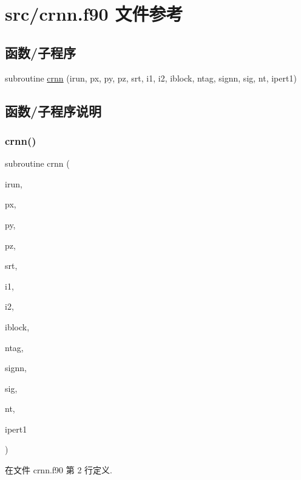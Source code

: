 \hypertarget{crnn_8f90}{}\section{src/crnn.f90 文件参考}
\label{crnn_8f90}
\subsection*{函数/子程序}
\begin{DoxyCompactItemize}
\item 
subroutine \mbox{\hyperlink{crnn_8f90_aee34fcfa3e0f0b41684097aa4d952c65}{crnn}} (irun, px, py, pz, srt, i1, i2, iblock, ntag, signn, sig, nt, ipert1)
\end{DoxyCompactItemize}


\subsection{函数/子程序说明}
\mbox{\label{crnn_8f90_aee34fcfa3e0f0b41684097aa4d952c65}} 
\subsubsection{\texorpdfstring{crnn()}{crnn()}}
{\footnotesize\ttfamily subroutine crnn (\begin{DoxyParamCaption}\item[{}]{irun,  }\item[{}]{px,  }\item[{}]{py,  }\item[{}]{pz,  }\item[{}]{srt,  }\item[{}]{i1,  }\item[{}]{i2,  }\item[{}]{iblock,  }\item[{}]{ntag,  }\item[{}]{signn,  }\item[{}]{sig,  }\item[{}]{nt,  }\item[{}]{ipert1 }\end{DoxyParamCaption})}



在文件 crnn.\+f90 第 2 行定义.

